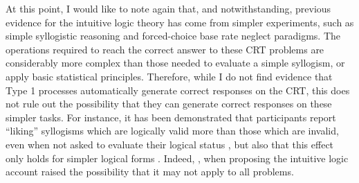 At this point, I would like to note again that,
\citet{DeNeys2013a} and \citep{Gangemi2015} notwithstanding,
previous evidence for the intuitive logic theory has come from simpler experiments,
such as simple syllogistic reasoning \citep{Morsanyi2012}
and forced-choice base rate neglect \citep{DeNeys2008} paradigms.
The operations required to reach the correct answer to these CRT problems
are considerably more complex than those needed to evaluate a simple syllogism,
or apply basic statistical principles.
Therefore, while I do not find evidence that Type 1 processes
automatically generate correct responses on the CRT,
this does not rule out the possibility that they can
generate correct responses on these simpler tasks.
For instance, it has been demonstrated that participants
report ``liking'' syllogisms which are logically valid
more than those which are invalid,
even when not asked to evaluate their logical status \citep{Morsanyi2012},
but also that this effect only holds for simpler logical forms
\citep[see also \citealp{Handley2015}]{Klauer2013}.
Indeed, \citet{DeNeys2012},
when proposing the intuitive logic account
raised the possibility that it
may not apply to all problems.

